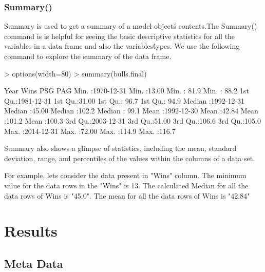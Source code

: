 \documentclass[a4paper]{article}
\begin{document}
\subsubsection{Summary()}
Summary is used to get a summary of a model object\'s contents.The Summary() command is is helpful for seeing the basic descriptive statistics for all the variables in a data frame and also the variables\' types. We use the following command to explore the summary of the data frame.
\begin{Schunk}
\begin{Sinput}
> options(width=80)
> summary(bulls.final)
\end{Sinput}
\begin{Soutput}
      Year                 Wins            PSG             PAG       
 Min.   :1970-12-31   Min.   :13.00   Min.   : 81.9   Min.   : 88.2  
 1st Qu.:1981-12-31   1st Qu.:31.00   1st Qu.: 96.7   1st Qu.: 94.9  
 Median :1992-12-31   Median :45.00   Median :102.2   Median : 99.1  
 Mean   :1992-12-30   Mean   :42.84   Mean   :101.2   Mean   :100.3  
 3rd Qu.:2003-12-31   3rd Qu.:51.00   3rd Qu.:106.6   3rd Qu.:105.0  
 Max.   :2014-12-31   Max.   :72.00   Max.   :114.9   Max.   :116.7  
\end{Soutput}
\end{Schunk}
Summary also shows a glimpse of statistics, including the mean, standard deviation, range, and percentiles of the values within the columns of a data set.
  
For example, lets consider the data present in "Wins" column. The minimum value for the data rows in the "Wins" is 13. The calculated Median for all the data rows of Wins is "45.0". The mean for all the data rows of Wins is "42.84"
\vspace{1cm}

\section{Results}
\subsection{Meta Data}
\end{document}
